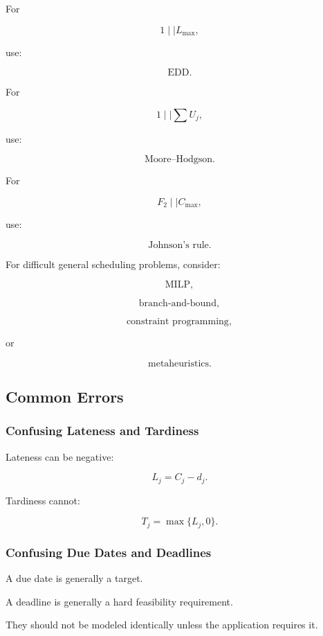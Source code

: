 For

\[
1\mid\mid L_{\max},
\]

use:

\[
\boxed{
\text{EDD}.
}
\]

For

\[
1\mid\mid\sum U_j,
\]

use:

\[
\boxed{
\text{Moore--Hodgson}.
}
\]

For

\[
F_2\mid\mid C_{\max},
\]

use:

\[
\boxed{
\text{Johnson's rule}.
}
\]

For difficult general scheduling problems, consider:

\[
\boxed{
\text{MILP},
}
\]

\[
\boxed{
\text{branch-and-bound},
}
\]

\[
\boxed{
\text{constraint programming},
}
\]

or

\[
\boxed{
\text{metaheuristics}.
}
\]

\subsection{Common Errors}
\label{subsec:scheduling-common-errors}

\subsubsection{Confusing Lateness and Tardiness}

Lateness can be negative:

\[
\boxed{
L_j=C_j-d_j.
}
\]

Tardiness cannot:

\[
\boxed{
T_j=\max\{L_j,0\}.
}
\]

\subsubsection{Confusing Due Dates and Deadlines}

A due date is generally a target.

A deadline is generally a hard feasibility requirement.

They should not be modeled identically unless the application requires it.

